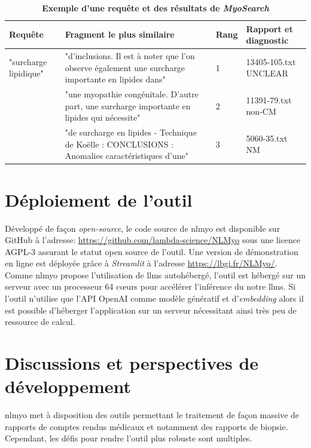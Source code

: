 \begin{table}[!ht]
\centering
\caption[Exemple d'une requête et des résultats de \textit{MyoSearch}]{\textbf{Exemple d'une requête et des résultats de \textit{MyoSearch}}}
\label{tab:myosearch_results}
\begin{tabularx}{\textwidth}{|l|X|p{1cm}|p{2cm}|}
\hline
\textbf{Requête} & \textbf{Fragment le plus similaire} & \textbf{Rang} & \textbf{Rapport et diagnostic} \\\hline
"surcharge lipidique" & "d’inclusions. Il est à noter que l’on observe également une surcharge importante en lipides dans" \newline & 1 & 13405-105.txt UNCLEAR \\
 & "une myopathie congénitale. D'autre part, une surcharge importante en lipides qui nécessite"\newline & 2 & 11391-79.txt non-CM \\
 & "de surcharge en lipides - Technique de Koëlle : CONCLUSIONS : Anomalies caractéristiques d’une" & 3 & 5060-35.txt NM \\ \hline
\end{tabularx}
\end{table}

\section{Déploiement de l'outil}
Développé de façon \textit{open-source}, le code source de \gls{nlmyo} est disponible sur GitHub à l'adresse: \url{https://github.com/lambda-science/NLMyo} sous une licence AGPL-3 assurant le statut open source de l'outil. Une version de démonstration en ligne est déployée grâce à \textit{Streamlit} à l'adresse \url{https://lbgi.fr/NLMyo/}. Comme \gls{nlmyo} propose l'utilisation de \gls{llms} autohébergé, l'outil est hébergé sur un serveur avec un processeur 64 cœurs pour accélérer l'inférence du notre \gls{llms}. Si l'outil n'utilise que l'API OpenAI comme modèle génératif et d'\textit{embedding} alors il est possible d'héberger l'application sur un serveur nécessitant ainsi très peu de ressource de calcul.

\section{Discussions et perspectives de développement}
\gls{nlmyo} met à disposition des outils permettant le traitement de façon massive de rapports de comptes rendus médicaux et notamment des rapports de biopsie. Cependant, les défis pour rendre l'outil plus robuste sont multiples. 

